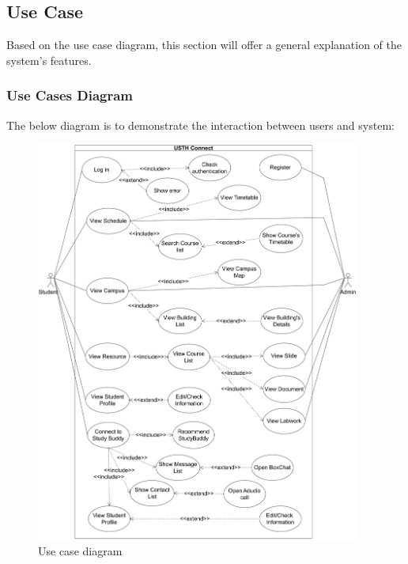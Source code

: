 \documentclass[12pt]{article}
\begin{document}
\pagebreak

\subsection{Use Case}
Based on the use case diagram, this section will offer a general explanation of the system's
features.

\subsubsection{Use Cases Diagram}
    The below diagram is to demonstrate the interaction between users and system:
    \begin{figure}[H]
        \centering
       \includegraphics[width=0.95\textwidth]{image/USTHConnect_usecase_diagram.pdf} 
        \caption{Use case diagram}
        \label{fig:usthconnect_use_case}
    \end{figure}

    \pagebreak
\end{document}

